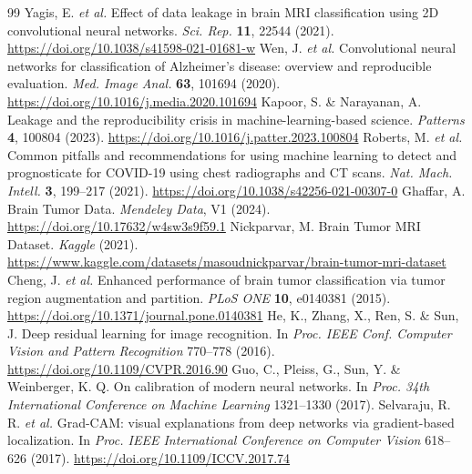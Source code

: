 ﻿\documentclass[11pt]{article}
\begin{document}
\begin{thebibliography}{99}
 Yagis, E. \textit{et al.} Effect of data leakage in brain MRI classification using 2D convolutional neural networks. \textit{Sci. Rep.} \textbf{11}, 22544 (2021). \url{https://doi.org/10.1038/s41598-021-01681-w}
 Wen, J. \textit{et al.} Convolutional neural networks for classification of Alzheimer's disease: overview and reproducible evaluation. \textit{Med. Image Anal.} \textbf{63}, 101694 (2020). \url{https://doi.org/10.1016/j.media.2020.101694}
 Kapoor, S. \& Narayanan, A. Leakage and the reproducibility crisis in machine-learning-based science. \textit{Patterns} \textbf{4}, 100804 (2023). \url{https://doi.org/10.1016/j.patter.2023.100804}
 Roberts, M. \textit{et al.} Common pitfalls and recommendations for using machine learning to detect and prognosticate for COVID-19 using chest radiographs and CT scans. \textit{Nat. Mach. Intell.} \textbf{3}, 199--217 (2021). \url{https://doi.org/10.1038/s42256-021-00307-0}
 Ghaffar, A. Brain Tumor Data. \textit{Mendeley Data}, V1 (2024). \url{https://doi.org/10.17632/w4sw3s9f59.1}
 Nickparvar, M. Brain Tumor MRI Dataset. \textit{Kaggle} (2021). \url{https://www.kaggle.com/datasets/masoudnickparvar/brain-tumor-mri-dataset}
 Cheng, J. \textit{et al.} Enhanced performance of brain tumor classification via tumor region augmentation and partition. \textit{PLoS ONE} \textbf{10}, e0140381 (2015). \url{https://doi.org/10.1371/journal.pone.0140381}
 He, K., Zhang, X., Ren, S. \& Sun, J. Deep residual learning for image recognition. In \textit{Proc. IEEE Conf. Computer Vision and Pattern Recognition} 770--778 (2016). \url{https://doi.org/10.1109/CVPR.2016.90}
 Guo, C., Pleiss, G., Sun, Y. \& Weinberger, K. Q. On calibration of modern neural networks. In \textit{Proc. 34th International Conference on Machine Learning} 1321--1330 (2017).
 Selvaraju, R. R. \textit{et al.} Grad-CAM: visual explanations from deep networks via gradient-based localization. In \textit{Proc. IEEE International Conference on Computer Vision} 618--626 (2017). \url{https://doi.org/10.1109/ICCV.2017.74}
\end{thebibliography}
\end{document}
